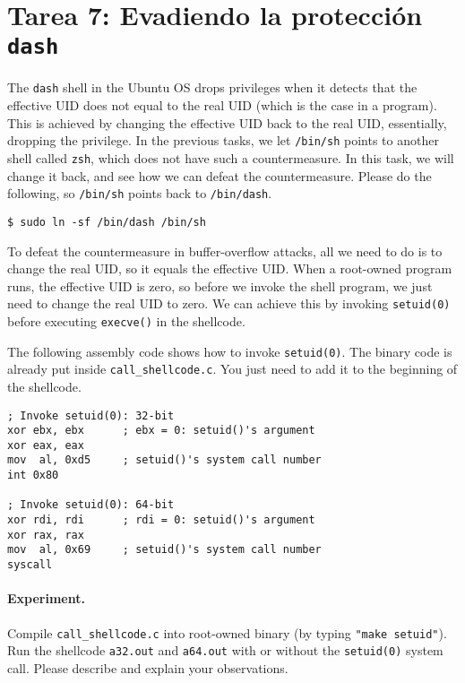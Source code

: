 \section{Tarea 7: Evadiendo la protección \texttt{dash}}

The \texttt{dash} shell in the Ubuntu OS 
drops privileges when it detects that the effective UID does not 
equal to the real UID (which is the case in a \setuid program). 
This is achieved by changing the 
effective UID back to the real UID, essentially, dropping the 
privilege.  In the previous tasks, we let \texttt{/bin/sh} points
to another shell called \texttt{zsh}, which does not have such
a countermeasure. In this task, we will change it back, 
and see how we can defeat the countermeasure. Please 
do the following, so \texttt{/bin/sh} points back to 
\texttt{/bin/dash}. 


\begin{lstlisting}
$ sudo ln -sf /bin/dash /bin/sh
\end{lstlisting}

To defeat the countermeasure in buffer-overflow attacks,
all we need to do is to change the real UID, so it equals the 
effective UID. When a root-owned \setuid program runs, the 
effective UID is zero, so before we invoke the shell program,
we just need to change the real UID to zero.
We can achieve this by invoking \texttt{setuid(0)} before executing 
\texttt{execve()} in the shellcode. 

The following assembly code shows how to invoke
\texttt{setuid(0)}. The binary code is already put inside 
\texttt{call\_shellcode.c}. You just need to add it to the 
beginning of the shellcode. 

\begin{lstlisting}[language={[x86masm]Assembler}]
; Invoke setuid(0): 32-bit
xor ebx, ebx      ; ebx = 0: setuid()'s argument
xor eax, eax
mov  al, 0xd5     ; setuid()'s system call number
int 0x80

; Invoke setuid(0): 64-bit
xor rdi, rdi      ; rdi = 0: setuid()'s argument
xor rax, rax       
mov  al, 0x69     ; setuid()'s system call number
syscall
\end{lstlisting}


\paragraph{Experiment.} Compile \texttt{call\_shellcode.c} into
root-owned binary (by typing \texttt{"make setuid"}). 
Run the shellcode \texttt{a32.out} and \texttt{a64.out} with or without 
the \texttt{setuid(0)} system call. Please describe and explain
your observations. 

